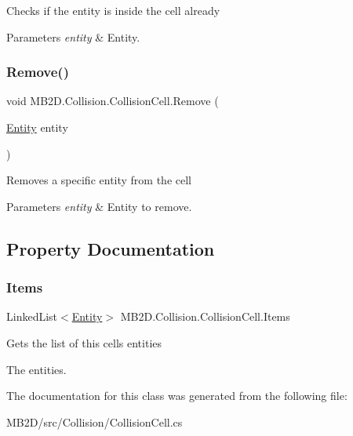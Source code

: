 Checks if the entity is inside the cell already 


\begin{DoxyParams}{Parameters}
{\em entity} & Entity.\\
\hline
\end{DoxyParams}
\hypertarget{class_m_b2_d_1_1_collision_1_1_collision_cell_a064f540f907885b4224119308cbf1761}{}\label{class_m_b2_d_1_1_collision_1_1_collision_cell_a064f540f907885b4224119308cbf1761} 
\subsubsection{\texorpdfstring{Remove()}{Remove()}}
{\footnotesize\ttfamily void M\+B2\+D.\+Collision.\+Collision\+Cell.\+Remove (\begin{DoxyParamCaption}\item[{\hyperlink{class_m_b2_d_1_1_entity_component_1_1_entity}{Entity}}]{entity }\end{DoxyParamCaption})\hspace{0.3cm}{\ttfamily [inline]}}



Removes a specific entity from the cell 


\begin{DoxyParams}{Parameters}
{\em entity} & Entity to remove.\\
\hline
\end{DoxyParams}


\subsection{Property Documentation}
\hypertarget{class_m_b2_d_1_1_collision_1_1_collision_cell_ab893dad8ce4d09c5ab38a5da93145755}{}\label{class_m_b2_d_1_1_collision_1_1_collision_cell_ab893dad8ce4d09c5ab38a5da93145755} 
\subsubsection{\texorpdfstring{Items}{Items}}
{\footnotesize\ttfamily Linked\+List$<$\hyperlink{class_m_b2_d_1_1_entity_component_1_1_entity}{Entity}$>$ M\+B2\+D.\+Collision.\+Collision\+Cell.\+Items\hspace{0.3cm}{\ttfamily [get]}}



Gets the list of this cells entities 

The entities.

The documentation for this class was generated from the following file\+:\begin{DoxyCompactItemize}
\item 
M\+B2\+D/src/\+Collision/Collision\+Cell.\+cs\end{DoxyCompactItemize}

